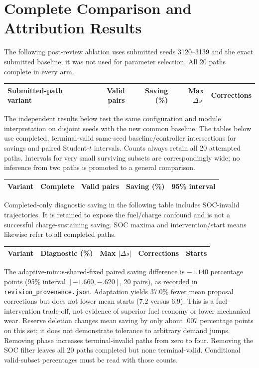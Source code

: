 \documentclass[11pt,a4paper]{article}
\begin{document}
\section{Complete Comparison and Attribution Results}
The following post-review ablation uses submitted seeds 3120--3139 and the exact submitted baseline; it was not used for parameter selection. All 20 paths complete in every arm.
\begin{center}\small\begin{tabularx}{\linewidth}{@{}Xrrrr@{}}\toprule
Submitted-path variant & Valid pairs & Saving (\%) & Max $|\Delta s|$ & Corrections\\\midrule

\end{tabularx}\end{center}
The independent results below test the same configuration and module interpretation on disjoint seeds with the new common baseline.
The tables below use completed, terminal-valid same-seed baseline/controller intersections for savings and paired Student-$t$ intervals. Counts always retain all 20 attempted paths. Intervals for very small surviving subsets are correspondingly wide; no inference from two paths is promoted to a general comparison.
\begin{center}\small\begin{tabularx}{\linewidth}{@{}Xrrrr@{}}\toprule
Variant & Complete & Valid pairs & Saving (\%) & 95\% interval\\\midrule

\end{tabularx}\end{center}
Completed-only diagnostic saving in the following table includes SOC-invalid trajectories. It is retained to expose the fuel/charge confound and is not a successful charge-sustaining saving. SOC maxima and intervention/start means likewise refer to all completed paths.
\begin{center}\small\begin{tabularx}{\linewidth}{@{}Xrrrr@{}}\toprule
Variant & Diagnostic (\%) & Max $|\Delta s|$ & Corrections & Starts\\\midrule

\end{tabularx}\end{center}
The adaptive-minus-shared-fixed paired saving difference is $-1.140$ percentage points (95\% interval $[-1.660,-.620]$, 20 pairs), as recorded in \texttt{revision\_provenance.json}. Adaptation yields 37.0\% fewer mean proposal corrections but does not lower mean starts (7.2 versus 6.9). This is a fuel--intervention trade-off, not evidence of superior fuel economy or lower mechanical wear. Reserve deletion changes mean saving by only about .007 percentage points on this set; it does not demonstrate tolerance to arbitrary demand jumps. Removing phase increases terminal-invalid paths from zero to four. Removing the SOC filter leaves all 20 paths completed but none terminal-valid. Conditional valid-subset percentages must be read with those counts.
\end{document}
